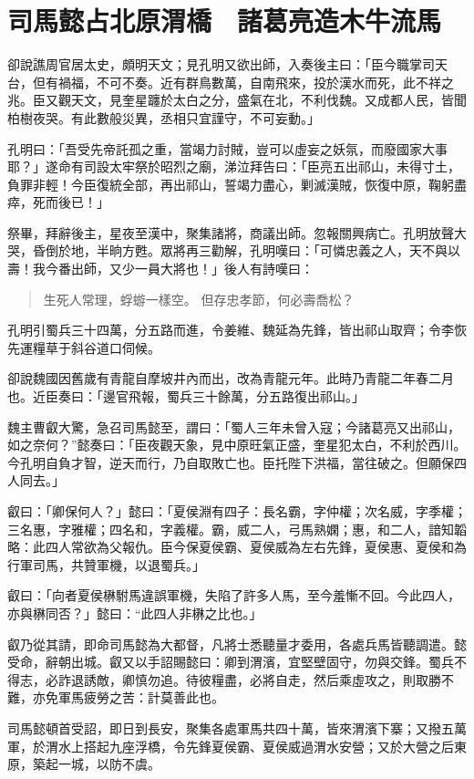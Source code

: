 
\chapter{司馬懿占北原渭橋　諸葛亮造木牛流馬}

卻說譙周官居太史，頗明天文；見孔明又欲出師，入奏後主曰：「臣今職掌司天台，但有禍福，不可不奏。近有群鳥數萬，自南飛來，投於漢水而死，此不祥之兆。臣又觀天文，見奎星躔於太白之分，盛氣在北，不利伐魏。又成都人民，皆聞柏樹夜哭。有此數般災異，丞相只宜謹守，不可妄動。」

孔明曰：「吾受先帝託孤之重，當竭力討賊，豈可以虛妄之妖氛，而廢國家大事耶？」遂命有司設太牢祭於昭烈之廟，涕泣拜告曰：「臣亮五出祁山，未得寸土，負罪非輕！今臣復統全部，再出祁山，誓竭力盡心，剿滅漢賊，恢復中原，鞠躬盡瘁，死而後已！」

祭畢，拜辭後主，星夜至漢中，聚集諸將，商議出師。忽報關興病亡。孔明放聲大哭，昏倒於地，半晌方甦。眾將再三勸解，孔明嘆曰：「可憐忠義之人，天不與以壽！我今番出師，又少一員大將也！」後人有詩嘆曰：

\begin{quote}
生死人常理，蜉蝣一樣空。
但存忠孝節，何必壽喬松？
\end{quote}

孔明引蜀兵三十四萬，分五路而進，令姜維、魏延為先鋒，皆出祁山取齊；令李恢先運糧草于斜谷道口伺候。

卻說魏國因舊歲有青龍自摩坡井內而出，改為青龍元年。此時乃青龍二年春二月也。近臣奏曰：「邊官飛報，蜀兵三十餘萬，分五路復出祁山。」

魏主曹叡大驚，急召司馬懿至，謂曰：「蜀人三年未曾入寇；今諸葛亮又出祁山，如之奈何？”懿奏曰：「臣夜觀天象，見中原旺氣正盛，奎星犯太白，不利於西川。今孔明自負才智，逆天而行，乃自取敗亡也。臣托陛下洪福，當往破之。但願保四人同去。」

叡曰：「卿保何人？」懿曰：「夏侯淵有四子：長名霸，字仲權；次名威，字季權；三名惠，字雅權；四名和，字義權。霸，威二人，弓馬熟嫻；惠，和二人，諳知韜略：此四人常欲為父報仇。臣今保夏侯霸、夏侯威為左右先鋒，夏侯惠、夏侯和為行軍司馬，共贊軍機，以退蜀兵。」

叡曰：「向者夏侯楙駙馬違誤軍機，失陷了許多人馬，至今羞慚不回。今此四人，亦與楙同否？」懿曰：“此四人非楙之比也。」

叡乃從其請，即命司馬懿為大都督，凡將士悉聽量才委用，各處兵馬皆聽調遣。懿受命，辭朝出城。叡又以手詔賜懿曰：卿到渭濱，宜堅壁固守，勿與交鋒。蜀兵不得志，必詐退誘敵，卿慎勿追。待彼糧盡，必將自走，然后乘虛攻之，則取勝不難，亦免軍馬疲勞之苦：計莫善此也。

司馬懿頓首受詔，即日到長安，聚集各處軍馬共四十萬，皆來渭濱下寨；又撥五萬軍，於渭水上搭起九座浮橋，令先鋒夏侯霸、夏侯威過渭水安營；又於大營之后東原，築起一城，以防不虞。

